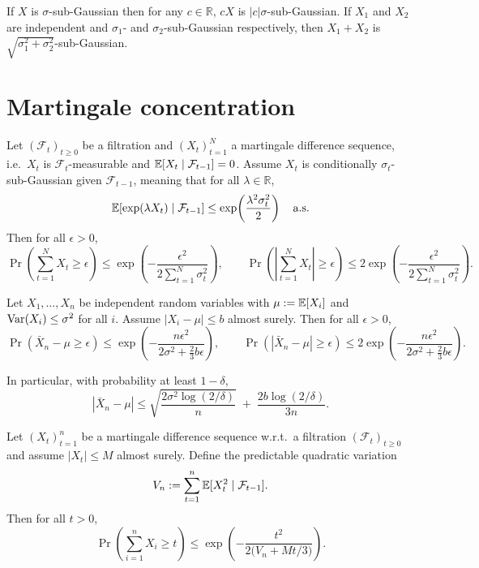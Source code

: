 \begin{lemma}\label{lemma:sub_gaussian_property_2}
If $X$ is $\sigma$-sub-Gaussian then for any $c\in\mathbb{R}$, $cX$ is
$|c|\sigma$-sub-Gaussian. If $X_1$ and $X_2$ are independent and
$\sigma_1$- and $\sigma_2$-sub-Gaussian respectively, then $X_1+X_2$ is
$\sqrt{\sigma_1^2+\sigma_2^2}$-sub-Gaussian.
\end{lemma}

\section{Martingale concentration}

\begin{theorem}\label{thm:Azuma}
Let $(\mathcal{F}_t)_{t\ge 0}$ be a filtration and $(X_t)_{t=1}^N$ a martingale
difference sequence, i.e.\ $X_t$ is $\mathcal{F}_t$-measurable and
$\mathbb{E}[X_t\mid \mathcal{F}_{t-1}]=0$.
Assume $X_t$ is conditionally $\sigma_t$-sub-Gaussian given $\mathcal{F}_{t-1}$,
meaning that for all $\lambda\in\mathbb{R}$,
\[
\mathbb{E}\!\left[\exp(\lambda X_t)\mid \mathcal{F}_{t-1}\right]
\le
\exp\!\left(\frac{\lambda^2\sigma_t^2}{2}\right)\quad \text{a.s.}
\]
Then for all $\epsilon>0$,
\[
\Pr\!\left(\sum_{t=1}^N X_t \ge \epsilon\right)
\le
\exp\!\left(-\frac{\epsilon^2}{2\sum_{t=1}^N\sigma_t^2}\right),
\qquad
\Pr\!\left(\left|\sum_{t=1}^N X_t\right| \ge \epsilon\right)
\le
2\exp\!\left(-\frac{\epsilon^2}{2\sum_{t=1}^N\sigma_t^2}\right).
\]
\end{theorem}

\begin{lemma}\label{lem:bernstein_iid}
Let $X_1,\dots,X_n$ be independent random variables with
$\mu:=\mathbb{E}[X_i]$ and $\operatorname{Var}(X_i)\le \sigma^2$ for all $i$.
Assume $|X_i-\mu|\le b$ almost surely.
Then for all $\epsilon>0$,
\[
\Pr\!\left(\bar X_n-\mu \ge \epsilon\right)
\le
\exp\!\left(
-\frac{n\epsilon^2}{2\sigma^2+\frac{2}{3}b\epsilon}
\right),
\qquad
\Pr\!\left(|\bar X_n-\mu| \ge \epsilon\right)
\le
2\exp\!\left(
-\frac{n\epsilon^2}{2\sigma^2+\frac{2}{3}b\epsilon}
\right).
\]
\end{lemma}

In particular, with probability at least $1-\delta$,
\[
|\bar X_n-\mu|
\le
\sqrt{\frac{2\sigma^2\log(2/\delta)}{n}}
\;+\;
\frac{2b\log(2/\delta)}{3n}.
\]

\begin{lemma}\label{lem:freedman}
Let $(X_t)_{t=1}^n$ be a martingale difference sequence w.r.t.\ a filtration
$(\mathcal{F}_t)_{t\ge 0}$ and assume $|X_t|\le M$ almost surely.
Define the predictable quadratic variation
\[
V_n := \sum_{t=1}^n \mathbb{E}[X_t^2\mid \mathcal{F}_{t-1}].
\]
Then for all $t>0$,
\[
\Pr\!\left(\sum_{i=1}^n X_i \ge t\right)
\le
\exp\!\left(
-\frac{t^2}{2\big(V_n + Mt/3\big)}
\right).
\]
\end{lemma}

